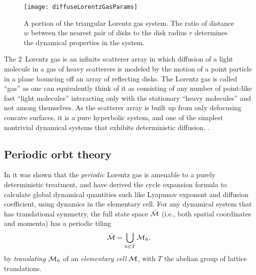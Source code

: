 \documentclass[aps,pre,showpacs,preprint,groupedaddress,floatfix]{revtex4-1}
\begin{document}
\begin{figure}[htbp]
  \begin{center}

    \texttt{[image: diffuseLorentzGasParams]}

  \end{center}
  \caption[]{\label{fig-schrieberFig1} A portion of the triangular
    Lorentz gas system. The ratio of distance $w$ between the nearest
    pair of disks to the disk radius $r$ determines the dynamical
    properties in the system.}

\end{figure}

The $2$\dmn\ Lorentz gas is an infinite scatterer array in which
diffusion of a light molecule in a gas of heavy scatterers is modeled
by the motion of a point particle in a plane bouncing off an array of
reflecting disks. The Lorentz gas is called ``gas'' as one can
equivalently think of it as consisting of any number of point-like
fast ``light molecules'' interacting only with the stationary ``heavy
molecules'' and not among themselves.  As the scatterer array is built
up from only defocusing concave surfaces, it is a pure hyperbolic
system, and one of the simplest nontrivial dynamical systems that
exhibits deterministic diffusion, .


\subsection{Periodic orbt theory}


In  it was shown that the {\em periodic} Lorentz gas is
amenable to a purely deterministic treatment, and have derived the
cycle expansion formula to calculate global dynamical quantities such
like Lyapunov exponent and diffusion coefficient, using dynamics in
the elementary cell. For any dynamical system that has translational
symmetry, the full state space $\hat {{\cal M}}$ (i.e., both spatial coordinates
and momenta) has a periodic tiling \[\hat {{\cal M}}=\bigcup_{ \hat n \in T}
{\cal M}_{\hat n},\] by {\em translating} ${\cal M}_{\hat n}$ of an {\em elementary
  cell} ${\cal M}$, with $T$ the abelian group of lattice translations.
\end{document}
